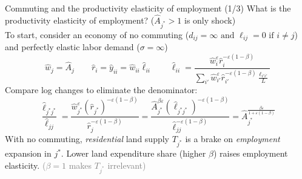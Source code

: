 \documentclass[11pt,notes=hide,aspectratio=169]{beamer}
\begin{document}
\begin{frame}{Commuting and the productivity elasticity of employment (1/3)}
What is the productivity elasticity of employment? ($\hat{A}_{j^{*}} > 1$ is only shock) \\
To start, consider an economy of no commuting ($d_{ij} = \infty \text{ and } \ell_{ij} = 0 \text{ if } i \neq j$) and perfectly elastic labor demand ($\sigma = \infty$)
\begin{equation*}
\hat{w}_{j}
=
\hat{A}_j
\qquad
\hat{r}_{i}
=
\hat{y}_{ii}
=
\hat{w}_{ii} \hat{\ell}_{ii}
\qquad
\hat{\ell}_{ii} 
=
\frac{\hat{w}_{i}^{\varepsilon}\hat{r}_{i}^{-\varepsilon(1-\beta)}}{\sum_{i'} \hat{w}_{i'}^{\varepsilon} \hat{r}_{i'}^{-\varepsilon(1-\beta)} \frac{\ell_{i'i'}}{L}}
\end{equation*}
Compare log changes to eliminate the denominator:
\begin{equation*}
\frac{\hat{\ell}_{j^{*}j^{*}}}{\hat{\ell}_{jj}}
=
\frac{\hat{w}_{j^{*}}^{\varepsilon}\left(\hat{r}_{j^{*}}\right)^{-\varepsilon(1-\beta)}}%
{\hat{r}_{j}^{-\varepsilon(1-\beta)}}
=
\frac{\hat{A}_{j^{*}}^{\beta\varepsilon}\left(\hat{\ell}_{j^{*}j^{*}}\right)^{-\varepsilon(1-\beta)}}%
{\hat{\ell}_{jj}^{-\varepsilon(1-\beta)}}
=
\hat{A}_{j^{*}}^{\frac{\beta\varepsilon}{1+\varepsilon(1-\beta)}}
\end{equation*}
With no commuting, \textit{residential} land supply $T_{j^*}$ is a brake on \textit{employment} expansion in $j^*$.
Lower land expenditure share (higher $\beta$) raises employment elasticity.
\textcolor{gray}{($\beta = 1$ makes $T_{j^*}$ irrelevant)}
\end{frame}
\end{document}
